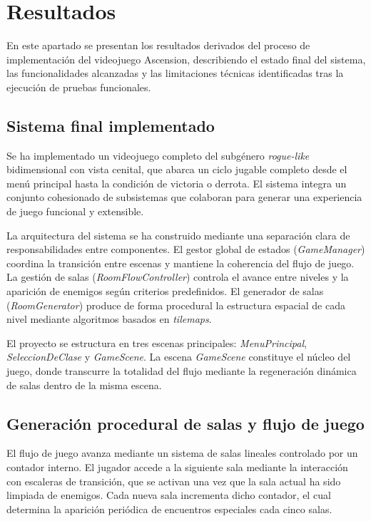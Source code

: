 \chapter{Resultados}

En este apartado se presentan los resultados derivados del proceso de implementación del videojuego Ascension, describiendo el estado final del sistema, las funcionalidades alcanzadas y las limitaciones técnicas identificadas tras la ejecución de pruebas funcionales.

\section{Sistema final implementado}

Se ha implementado un videojuego completo del subgénero \textit{rogue-like} bidimensional con vista cenital, que abarca un ciclo jugable completo desde el menú principal hasta la condición de victoria o derrota. El sistema integra un conjunto cohesionado de subsistemas que colaboran para generar una experiencia de juego funcional y extensible.

La arquitectura del sistema se ha construido mediante una separación clara de responsabilidades entre componentes. El gestor global de estados (\textit{GameManager}) coordina la transición entre escenas y mantiene la coherencia del flujo de juego. La gestión de salas (\textit{RoomFlowController}) controla el avance entre niveles y la aparición de enemigos según criterios predefinidos. El generador de salas (\textit{RoomGenerator}) produce de forma procedural la estructura espacial de cada nivel mediante algoritmos basados en \textit{tilemaps}.

El proyecto se estructura en tres escenas principales: \textit{MenuPrincipal}, \textit{SeleccionDeClase} y \textit{GameScene}. La escena \textit{GameScene} constituye el núcleo del juego, donde transcurre la totalidad del flujo mediante la regeneración dinámica de salas dentro de la misma escena.

\section{Generación procedural de salas y flujo de juego}

El flujo de juego avanza mediante un sistema de salas lineales controlado por un contador interno. El jugador accede a la siguiente sala mediante la interacción con escaleras de transición, que se activan una vez que la sala actual ha sido limpiada de enemigos. Cada nueva sala incrementa dicho contador, el cual determina la aparición periódica de encuentros especiales cada cinco salas.

